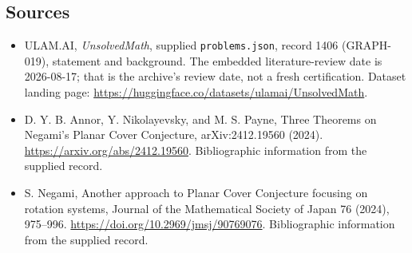 \documentclass[11pt,a4paper]{article}
\begin{document}
\subsection{Sources}

{\small

\begin{itemize}

\item[\hypertarget{source:1406:1}{S1}] ULAM.AI, \emph{UnsolvedMath}, supplied \texttt{problems.json}, record 1406 (GRAPH-019), statement and background. The embedded literature-review date is 2026-08-17; that is the archive’s review date, not a fresh certification. Dataset landing page: \url{https://huggingface.co/datasets/ulamai/UnsolvedMath}.

\item[\hypertarget{source:1406:2}{S2}] D. Y. B. Annor, Y. Nikolayevsky, and M. S. Payne, Three Theorems on Negami's Planar Cover Conjecture, arXiv:2412.19560 (2024). \url{https://arxiv.org/abs/2412.19560}. Bibliographic information from the supplied record.

\item[\hypertarget{source:1406:3}{S3}] S. Negami, Another approach to Planar Cover Conjecture focusing on rotation systems, Journal of the Mathematical Society of Japan 76 (2024), 975–996. \url{https://doi.org/10.2969/jmsj/90769076}. Bibliographic information from the supplied record.

\end{itemize}

}

\label{end:1406}
\end{document}
